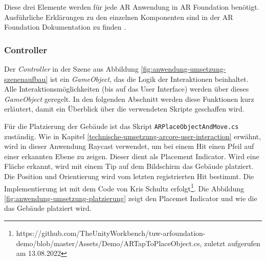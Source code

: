 Diese drei Elemente werden für jede AR Anwendung in AR Foundation benötigt. Ausführliche Erklärungen zu den einzelnen Komponenten sind in der AR Foundation Dokumentation zu finden \cite*{UnityARFoundation}.

\subsubsection{Controller}
\label{technische-umsetzung-platzierung-auf-einer-beliebigen-flaeche-controller}
Der \textit{Controller} in der Szene aus Abbildung \ref*{fig:anwendung-umsetzung-szenenaufbau} ist ein \textit{GameObject}, das die Logik der Interaktionen beinhaltet. Alle Interaktionsmöglichkeiten (bis auf das User Interface) werden über dieses \textit{GameObject} geregelt. In den folgenden Abschnitt werden diese Funktionen kurz erläutert, damit ein Überblick über die verwendeten Skripte geschaffen wird.

\label{technische-umsetzung-platzierung-normal}
Für die Platzierung der Gebäude ist das Skript \texttt{ARPlaceObjectAndMove.cs} zuständig. Wie in Kapitel \ref*{technische-umsetzung-arcore-user-interaction} erwähnt, wird in dieser Anwendung Raycast verwendet, um bei einem Hit einen Pfeil auf einer erkannten Ebene zu zeigen. Dieser dient als Placement Indicator. Wird eine Fläche erkannt, wird mit einem Tip auf dem Bildschirm das Gebäude platziert. Die Position und Orientierung wird vom letzten registrierten Hit bestimmt. Die Implementierung ist mit dem Code von Kris Schultz erfolgt\footnote{https://github.com/TheUnityWorkbench/tuw-arfoundation-demo/blob/master/Assets/Demo/ARTapToPlaceObject.cs, zuletzt aufgerufen am 13.08.2022}. Die Abbildung \ref*{fig:anwendung-umsetzung-platzierung} zeigt den Placemet Indicator und wie die das Gebäude platziert wird.

